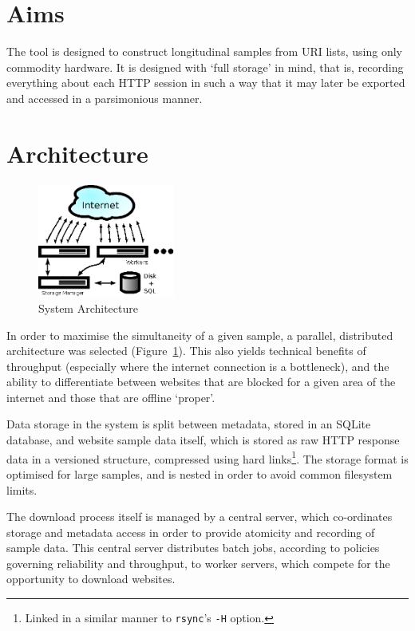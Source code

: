 \documentclass[11pt]{article}
\begin{document}
\section{Aims}
The tool is designed to construct longitudinal samples from URI lists, using only commodity hardware.  It is designed with `full storage' in mind, that is, recording everything about each HTTP session in such a way that it may later be exported and accessed in a parsimonious manner.

\section{Architecture}

\begin{figure}[h]
\centering
\includegraphics[width=0.4\textwidth]{images/arch.eps}
\caption{System Architecture}
\label{fig:arch}
\end{figure}
In order to maximise the simultaneity of a given sample, a parallel, distributed architecture was selected (Figure~\ref{fig:arch}).  This also yields technical benefits of throughput (especially where the internet connection is a bottleneck), and the ability to differentiate between websites that are blocked for a given area of the internet and those that are offline `proper'.

Data storage in the system is split between metadata, stored in an SQLite database, and website sample data itself, which is stored as raw HTTP response data in a versioned structure, compressed using hard links\footnote{Linked in a similar manner to \texttt{rsync}'s \texttt{-H} option.}.  The storage format is optimised for large samples, and is nested in order to avoid common filesystem limits.

The download process itself is managed by a central server, which co-ordinates storage and metadata access in order to provide atomicity and recording of sample data.  This central server distributes batch jobs, according to policies governing reliability and throughput, to worker servers, which compete for the opportunity to download websites.
\end{document}
